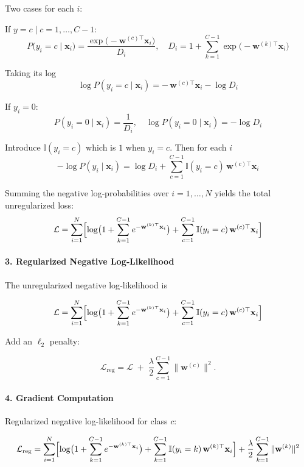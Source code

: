 \documentclass{article}
\begin{document}
Two cases for each \(i\):

If \(y = c \;|\; c = 1, \dots, C-1\):
\[
P\bigl(y_i = c \mid \mathbf{x}_i\bigr) =
\frac{\exp\bigl(-\mathbf{w}^{(c)\top} \mathbf{x}_i\bigr)}{D_i},
\quad
D_i = 1 + \sum_{k=1}^{C-1} \exp\bigl(-\mathbf{w}^{(k)\top} \mathbf{x}_i\bigr)
\]

Taking its log
\[
\log P(y_i=c\mid \mathbf{x}_i) = -\,
\mathbf{w}^{(c)\top}\mathbf{x}_i - \log D_i
\]

If $y_i=0$:
\[
P(y_i=0\mid\mathbf{x}_i) = \frac{1}{D_i},
\quad
\log P(y_i=0\mid\mathbf{x}_i) = -\log D_i
\]


Introduce \(\mathbb{I}(y_i=c)\) which is \(1\) when \(y_i=c\). Then for each $i$
\[
-\log P(y_i\mid \mathbf{x}_i) = \log D_i + \sum_{c=1}^{C-1}\mathbb{I}(y_i=c)\,
\mathbf{w}^{(c)\top}\mathbf{x}_i
\]

Summing the negative log‐probabilities over \(i=1,\dots,N\) yields the total unregularized loss:
\[
\mathcal{L}
= \sum_{i=1}^N
  \Bigl[
    \log\bigl(1 + \sum_{k=1}^{C-1}e^{-\mathbf{w}^{(k)\top}\mathbf{x}_i}\bigr)
    + \sum_{c=1}^{C-1}\mathbb{I}(y_i=c)\,\mathbf{w}^{(c)\top}\mathbf{x}_i
  \Bigr]
\]

\paragraph{3. Regularized Negative Log‐Likelihood}


The unregularized negative log‐likelihood is


\[
\mathcal{L}
= \sum_{i=1}^N
  \Bigl[
    \log\bigl(1 + \sum_{k=1}^{C-1}e^{-\mathbf{w}^{(k)\top}\mathbf{x}_i}\bigr)
    + \sum_{c=1}^{C-1}\mathbb{I}(y_i=c)\,\mathbf{w}^{(c)\top}\mathbf{x}_i
  \Bigr]
\]


Add an \(\ell_2\) penalty:


\[
\mathcal{L}_{\mathrm{reg}}
=
\mathcal{L}
\;+\;
\frac{\lambda}{2}\sum_{c=1}^{C-1}\bigl\|\mathbf{w}^{(c)}\bigr\|^2.
\]



\paragraph{4. Gradient Computation}

Regularized negative log-likelihood for class \(c\):

\[
\mathcal{L}_{\mathrm{reg}}
=\sum_{i=1}^N
\Bigl[
\log\bigl(1 + \sum_{k=1}^{C-1}e^{-\mathbf{w}^{(k)\top}\mathbf{x}_i}\bigr)
+\sum_{k=1}^{C-1}\mathbb{I}(y_i=k)\,\mathbf{w}^{(k)\top}\mathbf{x}_i
\Bigr]
+\frac{\lambda}{2}\sum_{k=1}^{C-1}\|\mathbf{w}^{(k)}\|^2
\]
\end{document}
